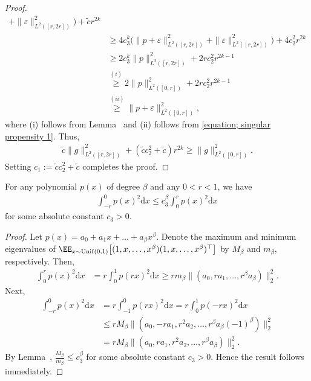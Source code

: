 \documentclass[12pt,a4paper,pdftex,onepage]{article}
\newcommand{\de}{\mathrm{d}}
\begin{document}
\begin{proof}
\begin{align*}
+ \|\varepsilon \|^2_{L^2([r,2r])}\bigr) 
+ \tilde{c}r^{2k} 
\\
&\geq 4c_3^k 
\bigl(\|p+\varepsilon \|^2_{L^2([r,2r])} 
+ \|\varepsilon \|^2_{L^2([r,2r])}\bigr) 
+ 4c_2^2r^{2k} 
\\
&\geq 2c_3^k \|p\|^2_{L^2([r,2r])}
+ 2rc_2^2r^{2k-1}
\\
&\stackrel{(i)}{\geq} 2\|p\|^2_{L^2([0,r])} 
+2rc_2^2r^{2k-1} 
\\
&\stackrel{(ii)}{\geq}  \| p + \varepsilon\|^2_{L^2([0,r])},
\end{align*}
where (i) follows from Lemma~ and (ii) follows from \eqref{equation; singular propensity 1}.
Thus,
\begin{align*}
\tilde{c}  \|g\|^2_{L^2([r,2r])}  
+ (\tilde{c} c_2^2 + \tilde{c})r^{2k} 
\geq \| g\|^2_{L^2([0,r])}.
\end{align*}
Setting \(c_1 := \tilde{c}c_2^2 + \tilde{c}\) completes the proof.
\end{proof}

\begin{lemma}\label{lemma; polynomial integral ratio}
For any polynomial \(p(x)\) of degree \(\beta\) and any \(0<r<1\), we have
\begin{align*}
\int_{-r}^0 p(x)^2 \de x 
\leq c_3^\beta \int_0^r p(x)^2 \de x
\end{align*}
for some absolute constant \(c_3>0\).
\end{lemma}

\begin{proof}
Let \(p(x)= a_0 + a_1 x + \dots + a_\beta x^\beta\).
Denote the maximum and minimum eigenvalues of 
\(\EE_{x \sim \operatorname{Unif}(0,1)}\bigl[(1,x,\dots,x^\beta)(1,x,\dots,x^\beta)^\top\bigr]\) 
by \(M_\beta\) and \(m_\beta\), respectively. Then,
\begin{align*}
\int_0^r p(x)^2 \de x 
&= r \int_0^1 p(rx)^2 \de x 
\geq  rm_\beta 
\|(a_0, ra_1, \dots, r^\beta a_\beta) \|_2^2.
\end{align*}
Next,
\begin{align*}
\int_{-r}^0 p(x)^2 \de x 
&= r \int_{-1}^0 p(rx)^2 \de x 
= r \int_0^1 p(-rx)^2 \de x 
\\
&\leq  rM_\beta 
\bigl\|(a_0, -ra_1, r^2 a_2, \dots, r^\beta a_\beta(-1)^\beta)\bigr\|_2^2 
\\
&= rM_\beta 
\|(a_0, ra_1, r^2 a_2, \dots, r^\beta a_\beta)\|_2^2.
\end{align*}
By Lemma~, \(\frac{M_\beta}{m_\beta} \leq c_3^\beta\) for some absolute constant \(c_3>0\). 
Hence the result follows immediately.
\end{proof}
\end{document}
